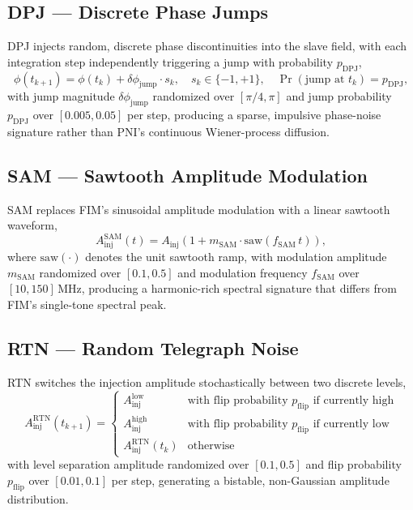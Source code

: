 \documentclass[12pt, a4paper]{report}
\begin{document}
\subsection{DPJ — Discrete Phase Jumps}
DPJ injects random, discrete phase discontinuities into the slave field, with each integration step independently triggering a jump with probability $p_{\text{DPJ}}$,
\begin{equation}
    \phi(t_{k+1}) = \phi(t_k) + \delta\phi_{\text{jump}}\cdot s_k, \quad s_k \in \{-1, +1\}, \quad \Pr(\text{jump at } t_k) = p_{\text{DPJ}},
\end{equation}
with jump magnitude $\delta\phi_{\text{jump}}$ randomized over $[\pi/4, \pi]$ and jump probability $p_{\text{DPJ}}$ over $[0.005, 0.05]$ per step, producing a sparse, impulsive phase-noise signature rather than PNI's continuous Wiener-process diffusion.

\subsection{SAM — Sawtooth Amplitude Modulation}
SAM replaces FIM's sinusoidal amplitude modulation with a linear sawtooth waveform,
\begin{equation}
    A_{\text{inj}}^{\text{SAM}}(t) = A_{\text{inj}}\left(1 + m_{\text{SAM}} \cdot \text{saw}(f_{\text{SAM}}\, t)\right),
\end{equation}
where $\text{saw}(\cdot)$ denotes the unit sawtooth ramp, with modulation amplitude $m_{\text{SAM}}$ randomized over $[0.1, 0.5]$ and modulation frequency $f_{\text{SAM}}$ over $[10, 150]\,\text{MHz}$, producing a harmonic-rich spectral signature that differs from FIM's single-tone spectral peak.

\subsection{RTN — Random Telegraph Noise}
RTN switches the injection amplitude stochastically between two discrete levels,
\begin{equation}
    A_{\text{inj}}^{\text{RTN}}(t_{k+1}) = \begin{cases}
        A_{\text{inj}}^{\text{low}} & \text{with flip probability } p_{\text{flip}} \text{ if currently high} \\
        A_{\text{inj}}^{\text{high}} & \text{with flip probability } p_{\text{flip}} \text{ if currently low} \\
        A_{\text{inj}}^{\text{RTN}}(t_k) & \text{otherwise}
    \end{cases}
\end{equation}
with level separation amplitude randomized over $[0.1, 0.5]$ and flip probability $p_{\text{flip}}$ over $[0.01, 0.1]$ per step, generating a bistable, non-Gaussian amplitude distribution.
\end{document}
